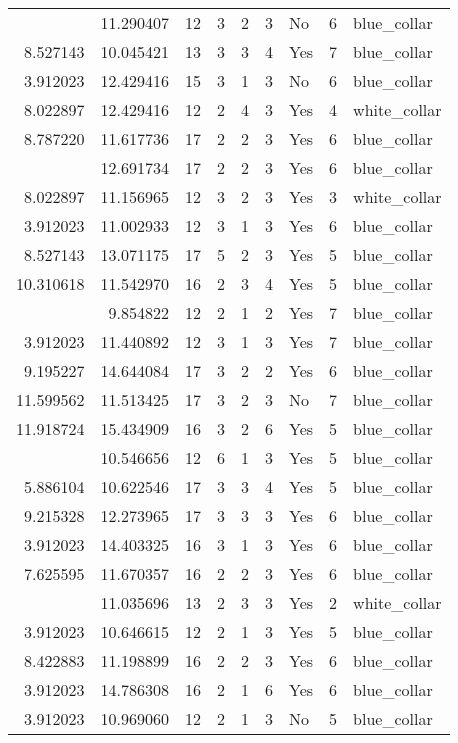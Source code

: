 \documentclass[
]{article}
\begin{document}
\begin{longtable}[t]{rrrrrllrl}
\addlinespace
8.055158 & 11.290407 & 12 & 3 & 2 & 3 & No & 6 & blue\_collar\\
8.527143 & 10.045421 & 13 & 3 & 3 & 4 & Yes & 7 & blue\_collar\\
3.912023 & 12.429416 & 15 & 3 & 1 & 3 & No & 6 & blue\_collar\\
8.022897 & 12.429416 & 12 & 2 & 4 & 3 & Yes & 4 & white\_collar\\
8.787220 & 11.617736 & 17 & 2 & 2 & 3 & Yes & 6 & blue\_collar\\
\addlinespace
10.001068 & 12.691734 & 17 & 2 & 2 & 3 & Yes & 6 & blue\_collar\\
8.022897 & 11.156965 & 12 & 3 & 2 & 3 & Yes & 3 & white\_collar\\
3.912023 & 11.002933 & 12 & 3 & 1 & 3 & Yes & 6 & blue\_collar\\
8.527143 & 13.071175 & 17 & 5 & 2 & 3 & Yes & 5 & blue\_collar\\
10.310618 & 11.542970 & 16 & 2 & 3 & 4 & Yes & 5 & blue\_collar\\
\addlinespace
3.912023 & 9.854822 & 12 & 2 & 1 & 2 & Yes & 7 & blue\_collar\\
3.912023 & 11.440892 & 12 & 3 & 1 & 3 & Yes & 7 & blue\_collar\\
9.195227 & 14.644084 & 17 & 3 & 2 & 2 & Yes & 6 & blue\_collar\\
11.599562 & 11.513425 & 17 & 3 & 2 & 3 & No & 7 & blue\_collar\\
11.918724 & 15.434909 & 16 & 3 & 2 & 6 & Yes & 5 & blue\_collar\\
\addlinespace
3.912023 & 10.546656 & 12 & 6 & 1 & 3 & Yes & 5 & blue\_collar\\
5.886104 & 10.622546 & 17 & 3 & 3 & 4 & Yes & 5 & blue\_collar\\
9.215328 & 12.273965 & 17 & 3 & 3 & 3 & Yes & 6 & blue\_collar\\
3.912023 & 14.403325 & 16 & 3 & 1 & 3 & Yes & 6 & blue\_collar\\
7.625595 & 11.670357 & 16 & 2 & 2 & 3 & Yes & 6 & blue\_collar\\
\addlinespace
9.017969 & 11.035696 & 13 & 2 & 3 & 3 & Yes & 2 & white\_collar\\
3.912023 & 10.646615 & 12 & 2 & 1 & 3 & Yes & 5 & blue\_collar\\
8.422883 & 11.198899 & 16 & 2 & 2 & 3 & Yes & 6 & blue\_collar\\
3.912023 & 14.786308 & 16 & 2 & 1 & 6 & Yes & 6 & blue\_collar\\
3.912023 & 10.969060 & 12 & 2 & 1 & 3 & No & 5 & blue\_collar\\

\end{longtable}
\end{document}
